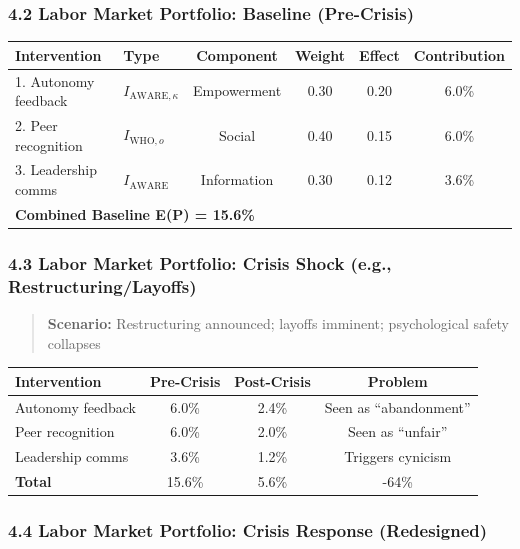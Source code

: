 \subsubsection*{4.2 Labor Market Portfolio: Baseline (Pre-Crisis)}

\begin{center}
\begin{tabular}{@{}llcccc@{}}
\toprule
\textbf{Intervention} & \textbf{Type} & \textbf{Component} & \textbf{Weight} & \textbf{Effect} & \textbf{Contribution} \\
\midrule
1. Autonomy feedback & $I_{\text{AWARE},\kappa}$ & Empowerment & 0.30 & 0.20 & 6.0\% \\
2. Peer recognition & $I_{\text{WHO},o}$ & Social & 0.40 & 0.15 & 6.0\% \\
3. Leadership comms & $I_{\text{AWARE}}$ & Information & 0.30 & 0.12 & 3.6\% \\
\midrule
\multicolumn{5}{l}{\textbf{Combined Baseline E(P) = 15.6\%}} \\
\midrule
\end{tabular}
\end{center}

\subsubsection*{4.3 Labor Market Portfolio: Crisis Shock (e.g., Restructuring/Layoffs)}

\begin{quote}
\textbf{Scenario:} Restructuring announced; layoffs imminent; psychological safety collapses
\end{quote}

\begin{center}
\begin{tabular}{@{}lccc@{}}
\toprule
\textbf{Intervention} & \textbf{Pre-Crisis} & \textbf{Post-Crisis} & \textbf{Problem} \\
\midrule
Autonomy feedback & 6.0\% & 2.4\% & Seen as ``abandonment'' \\
Peer recognition & 6.0\% & 2.0\% & Seen as ``unfair'' \\
Leadership comms & 3.6\% & 1.2\% & Triggers cynicism \\
\midrule
\textbf{Total} & 15.6\% & 5.6\% & -64\% \\
\midrule
\end{tabular}
\end{center}

\subsubsection*{4.4 Labor Market Portfolio: Crisis Response (Redesigned)}


